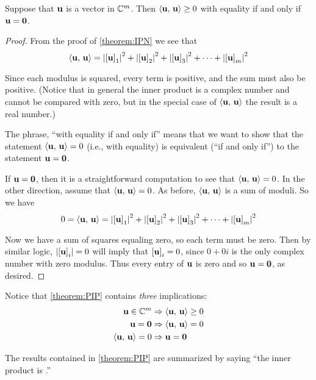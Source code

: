 \documentclass{ximera}
\begin{document}
\begin{theorem}
\label{theorem:PIP}

Suppose that $\mathbf{u}$ is a vector in $\mathbb{C}^{m}$.  Then
$\left\langle\mathbf{u},\,\mathbf{u}\right\rangle\geq 0$ with equality if and only if
$\mathbf{u}=\mathbf{0}$.

\begin{proof}
  From the proof of \ref{theorem:IPN}  we see that
  \[
    \left\langle\mathbf{u},\,\mathbf{u}\right\rangle
    =
    \left\lvert\left\lbrack\mathbf{u}\right\rbrack_{1}\right\rvert^2+
    \left\lvert\left\lbrack\mathbf{u}\right\rbrack_{2}\right\rvert^2+
    \left\lvert\left\lbrack\mathbf{u}\right\rbrack_{3}\right\rvert^2+
    \cdots+
    \left\lvert\left\lbrack\mathbf{u}\right\rbrack_{m}\right\rvert^2
  \]
  
  Since each modulus is squared, every term is positive, and the sum
  must also be positive.  (Notice that in general the inner product is
  a complex number and cannot be compared with zero, but in the
  special case of $\left\langle\mathbf{u},\,\mathbf{u}\right\rangle$ the result is a
  real number.)

  The phrase, ``with equality if and only if'' means that we want to
  show that the statement $\left\langle\mathbf{u},\,\mathbf{u}\right\rangle= 0$
  (i.e., with equality) is equivalent (``if and only if'') to the
  statement $\mathbf{u}=\mathbf{0}$.

  If $\mathbf{u}=\mathbf{0}$, then it is a straightforward computation
  to see that $\left\langle\mathbf{u},\,\mathbf{u}\right\rangle= 0$.  In the other
  direction, assume that $\left\langle\mathbf{u},\,\mathbf{u}\right\rangle= 0$.  As
  before, $\left\langle\mathbf{u},\,\mathbf{u}\right\rangle$ is a sum of moduli.  So
  we have
  \[
    0=\left\langle\mathbf{u},\,\mathbf{u}\right\rangle=
    \left\lvert\left\lbrack\mathbf{u}\right\rbrack_{1}\right\rvert^2+
    \left\lvert\left\lbrack\mathbf{u}\right\rbrack_{2}\right\rvert^2+
    \left\lvert\left\lbrack\mathbf{u}\right\rbrack_{3}\right\rvert^2+
    \cdots+
    \left\lvert\left\lbrack\mathbf{u}\right\rbrack_{m}\right\rvert^2
  \]

  Now we have a sum of squares equaling zero, so each term must be
  zero.  Then by similar logic,
  $\left\lvert\left\lbrack\mathbf{u}\right\rbrack_{i}\right\rvert=0$ will imply that
  $\left\lbrack\mathbf{u}\right\rbrack_{i}=0$, since $0+0i$ is the only complex
  number with zero modulus.  Thus every entry of $\mathbf{u}$ is zero
  and so $\mathbf{u}=\mathbf{0}$, as desired.

\end{proof}
\end{theorem}

Notice that \ref{theorem:PIP} contains \textit{three} implications:
\begin{align*}
  \mathbf{u}\in\mathbb{C}^{m}&\Rightarrow\left\langle\mathbf{u},\,\mathbf{u}\right\rangle\geq 0\\
  \mathbf{u}=\mathbf{0}&\Rightarrow\left\langle\mathbf{u},\,\mathbf{u}\right\rangle=0\\
  \left\langle\mathbf{u},\,\mathbf{u}\right\rangle=0&\Rightarrow\mathbf{u}=\mathbf{0}
\end{align*}

The results contained in \ref{theorem:PIP} are summarized by saying
``the inner product is .''
\end{document}
